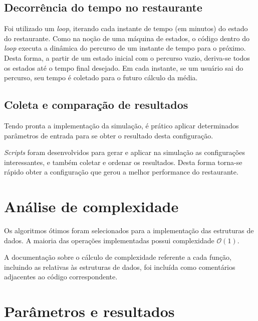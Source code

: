 \documentclass{article}
\begin{document}
\subsection{Decorrência do tempo no restaurante}
Foi utilizado um \textit{loop}, iterando cada instante de tempo (em minutos) do estado do restaurante. Como na noção de uma máquina de estados, o código dentro do \textit{loop} executa a dinâmica do percurso de um instante de tempo para o próximo. Desta forma, a partir de um estado inicial com o percurso vazio, deriva-se todos os estados até o tempo final desejado. Em cada instante, se um usuário sai do percurso, seu tempo é coletado para o futuro cálculo da média.

\subsection{Coleta e comparação de resultados}
Tendo pronta a implementação da simulação, é prático aplicar determinados parâmetros de entrada para se obter o resultado desta configuração.

\textit{Scripts} foram desenvolvidos para gerar e aplicar na simulação as configurações interessantes, e também coletar e ordenar os resultados. Desta forma torna-se rápido obter a configuração que gerou a melhor performance do restaurante.


\section{Análise de complexidade}
Os algoritmos ótimos foram selecionados para a implementação das estruturas de dados. A maioria das operações implementadas possui complexidade $\mathcal{O}(1)$.

A documentação sobre o cálculo de complexidade referente a cada função, incluindo as relativas às estruturas de dados, foi incluída como comentários adjacentes ao código correspondente.


\section{Parâmetros e resultados}
\end{document}
